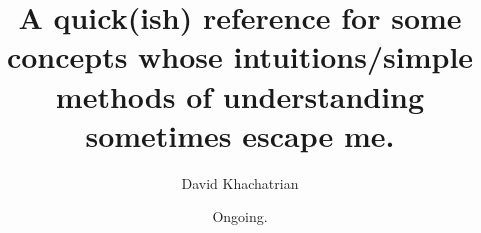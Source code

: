 \documentclass[letterpaper,12pt]{report}
\begin{document}
\title{A quick(ish) reference for some concepts whose
 intuitions/simple methods of understanding sometimes escape me.}
\author{David Khachatrian}
\date{Ongoing.}

\maketitle

\newpage


\tableofcontents

\newpage


























    
    



      \clearpage %
    \printindex %
    
\end{document}
